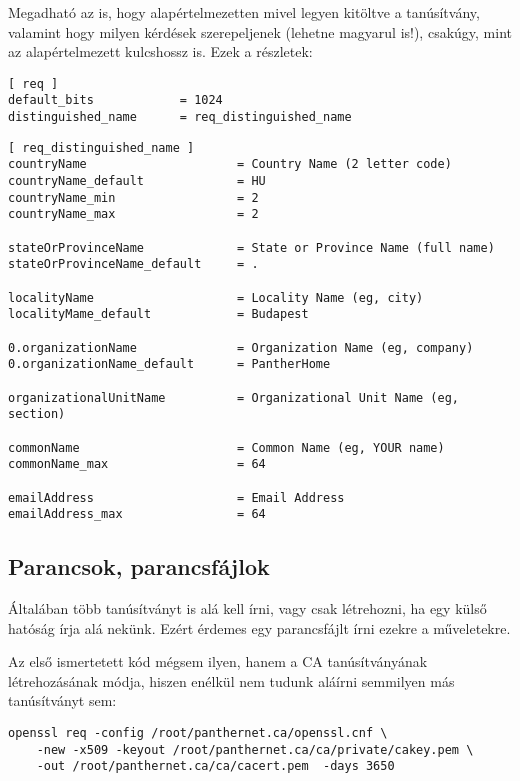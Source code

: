 Megadható az is, hogy alapértelmezetten mivel legyen kitöltve a tanúsítvány, valamint hogy milyen kérdések
szerepeljenek (lehetne magyarul is!), csakúgy, mint az alapértelmezett kulcshossz is. Ezek a részletek:

\begin{Verbatim}[frame=single]
[ req ]
default_bits            = 1024
distinguished_name      = req_distinguished_name
\end{Verbatim}


\begin{Verbatim}[frame=single,label=alapértelmezett értékek és feliratok]
[ req_distinguished_name ]
countryName                     = Country Name (2 letter code)
countryName_default             = HU
countryName_min                 = 2
countryName_max                 = 2

stateOrProvinceName             = State or Province Name (full name)
stateOrProvinceName_default     = .

localityName                    = Locality Name (eg, city)
localityMame_default            = Budapest

0.organizationName              = Organization Name (eg, company)
0.organizationName_default      = PantherHome

organizationalUnitName          = Organizational Unit Name (eg, section)

commonName                      = Common Name (eg, YOUR name)
commonName_max                  = 64

emailAddress                    = Email Address
emailAddress_max                = 64
\end{Verbatim}




\subsection{Parancsok, parancsfájlok}

Általában több tanúsítványt is alá kell írni, vagy csak létrehozni, ha egy külső hatóság írja alá nekünk. Ezért érdemes
egy parancsfájlt írni ezekre a műveletekre.

Az első ismertetett kód mégsem ilyen, hanem a CA tanúsítványának létrehozásának módja, hiszen enélkül nem tudunk aláírni
semmilyen más tanúsítványt sem:

\begin{Verbatim}[frame=single]
openssl req -config /root/panthernet.ca/openssl.cnf \
    -new -x509 -keyout /root/panthernet.ca/ca/private/cakey.pem \
    -out /root/panthernet.ca/ca/cacert.pem  -days 3650
\end{Verbatim}

